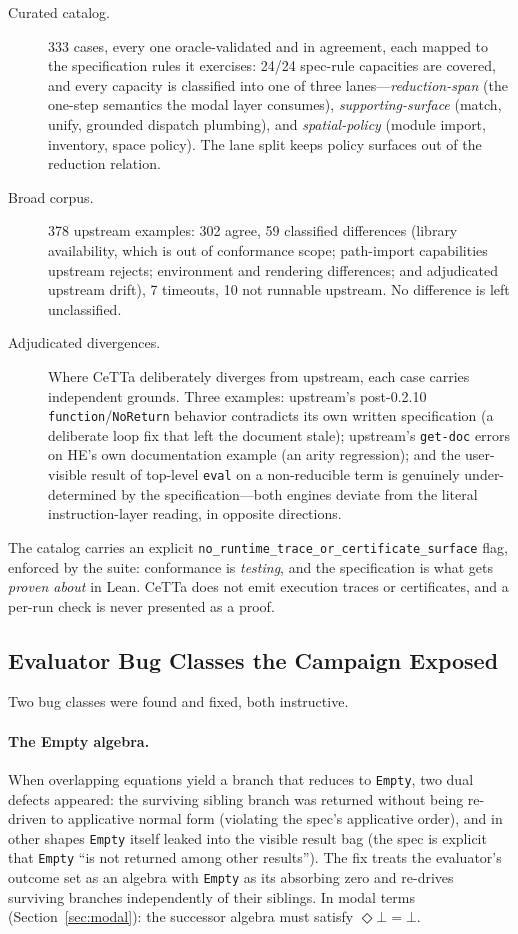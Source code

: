 \documentclass[11pt]{article}
\newcommand{\code}[1]{\texttt{#1}}
\newcommand{\HE}{\textup{HE}}
\newcommand{\CeTTa}{\textup{CeTTa}}
\begin{document}
\begin{description}
\item[Curated catalog.] 333 cases, every one oracle-validated and in
  agreement, each mapped to the specification rules it exercises:
  24/24 spec-rule capacities are covered, and every capacity is
  classified into one of three lanes---\emph{reduction-span} (the
  one-step semantics the modal layer consumes),
  \emph{supporting-surface} (match, unify, grounded dispatch
  plumbing), and \emph{spatial-policy} (module import, inventory,
  space policy).  The lane split keeps policy surfaces out of the
  reduction relation.
\item[Broad corpus.] 378 upstream examples: 302 agree, 59 classified
  differences (library availability, which is out of conformance
  scope; path-import capabilities upstream rejects; environment and
  rendering differences; and adjudicated upstream drift), 7 timeouts,
  10 not runnable upstream.  No difference is left unclassified.
\item[Adjudicated divergences.] Where \CeTTa{} deliberately diverges
  from upstream, each case carries independent grounds.  Three
  examples: upstream's post-0.2.10 \code{function}/\code{NoReturn}
  behavior contradicts its own written specification (a deliberate
  loop fix that left the document stale); upstream's \code{get-doc}
  errors on \HE{}'s own documentation example (an arity regression);
  and the user-visible result of top-level \code{eval} on a
  non-reducible term is genuinely under-determined by the
  specification---both engines deviate from the literal
  instruction-layer reading, in opposite directions.
\end{description}

The catalog carries an explicit
\code{no\_runtime\_trace\_or\_certificate\_surface} flag, enforced by
the suite: conformance is \emph{testing}, and the specification is
what gets \emph{proven about} in Lean.  \CeTTa{} does not emit
execution traces or certificates, and a per-run check is never
presented as a proof.

\subsection{Evaluator Bug Classes the Campaign Exposed}
\label{sec:bugclasses}

Two bug classes were found and fixed, both instructive.

\paragraph{The Empty algebra.}  When overlapping equations yield a
branch that reduces to \code{Empty}, two dual defects appeared: the
surviving sibling branch was returned without being re-driven to
applicative normal form (violating the spec's applicative order), and
in other shapes \code{Empty} itself leaked into the visible result bag
(the spec is explicit that \code{Empty} ``is not returned among other
results'').  The fix treats the evaluator's outcome set as an algebra
with \code{Empty} as its absorbing zero and re-drives surviving
branches independently of their siblings.  In modal terms
(Section~\ref{sec:modal}): the successor algebra must satisfy
$\Diamond\bot = \bot$.
\end{document}
